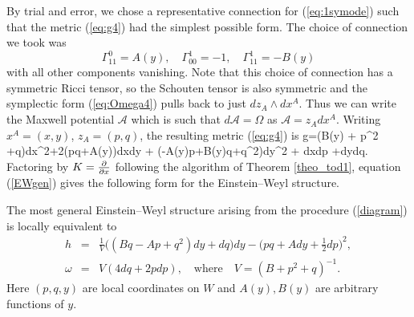 By trial and error, we chose a representative connection for (\ref{eq:1symode}) such that the metric (\ref{eq:g4}) had the simplest possible form. The choice of connection we took was
\[
\Gamma^{0}_{11}=A(y),\quad \Gamma^{1}_{00}=-1, \quad \Gamma^{1}_{11}=-B(y)
\]
with all other components vanishing. Note that this choice of connection has a symmetric Ricci tensor, so the Schouten tensor is also symmetric and the symplectic form (\ref{eq:Omega4}) pulls back to just $dz_A\wedge dx^A$. Thus we can write the Maxwell potential $\mathcal{A}$ which is such that $d\mathcal{A}=\Omega$ as $\mathcal{A}=z_Adx^A$. Writing $x^A=(x,y)$, $z_A=(p,q)$, the resulting metric (\ref{eq:g4}) is
\be
\label{einstein_1}
g=(B(y) + p^2 +q)dx^2+2(pq+A(y))dxdy + (-A(y)p+B(y)q+q^2)dy^2 + dxdp +dydq.
\ee
Factoring by $K=\frac{\partial}{\partial x}$ following the algorithm of Theorem
\ref{theo_tod1}, equation (\ref{EWgen}) gives the following form for the Einstein--Weyl structure.
\begin{prop}
\label{prop1}
The most general  Einstein--Weyl structure arising
from the procedure (\ref{diagram}) is locally equivalent to
\begin{eqnarray}
\label{ew_final}
h&=&\frac{1}{V}\big((Bq -Ap+ q^2)dy+dq\big)dy
-\Big({pq+A}dy+\frac{1}{2}dp\Big)^2, \label{genh} \\
\omega&=&V(4dq+2 pdp), \quad\mbox{where}\quad V=
({B}+ p^2+q)^{-1}.\nonumber
\end{eqnarray}
Here $(p, q, y)$ are local coordinates on $W$ and $A(y), B(y)$ are arbitrary functions of $y$.
\end{prop}


